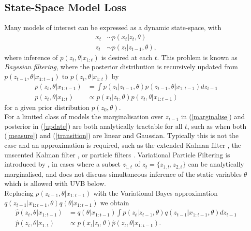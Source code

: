 \documentclass[12pt,a4paper]{article}\usepackage[]{graphicx}\usepackage[]{color}
\begin{document}
\subsection{State-Space Model Loss}

Many models of interest can be expressed as a dynamic state-space, with
\begin{align}
x_t &\sim p(x_t | z_{t}, \theta) \label{measure} \\
z_t &\sim p(z_t | z_{t-1}, \theta) \label{transition} ,
\end{align}
where inference of $p(z_t, \theta | x_{1:t})$ is desired at each $t$. This problem is known as \textit{Bayesian filtering}, where the posterior distribution is recursively updated from $p(z_{t-1}, \theta | x_{1:t-1})$ to $p(z_t, \theta | x_{1:t})$ by
\begin{align}
p(z_t, \theta | x_{1:t-1}) &= \int p(z_t | z_{t-1}, \theta) p(z_{t-1}, \theta | x_{1:t-1})dz_{t-1} \label{marginalise} \\
p(z_t, \theta | x_{1:t}) &\propto p(x_t | z_t, \theta) p(z_t, \theta | x_{1:t-1}) \label{update}
\end{align}
for a given prior distribution $p(z_0, \theta)$. 
\\

For a limited class of models the marginalisation over $z_{t-1}$ in (\ref{marginalise}) and posterior in (\ref{update}) are both analytically tractable for all $t$, such as when both (\ref{measure}) and (\ref{transition}) are linear and Gaussian. Typically this is not the case and an approximation is required, such as the extended Kalman filter \citep{Anderson1979}, the unscented Kalman filter \citep{Wan2000}, or particle filters \citet{Arulampalam2002}. Variational Particle Filtering is introduced by \citet{Smidl2008}, in cases where a subset $z_{1, t}$ of $z_t = \{z_{1, t}, z_{2, t}\}$ can be analytically marginalised, and does not discuss simultaneous inference of the static variables $\theta$ which is allowed with UVB below.
\\

Replacing $p(z_{t-1}, \theta | x_{1:t-1})$ with the Variational Bayes approximation $q(z_{t-1} | x_{1:t-1}, \theta)q(\theta|x_{1:t-1})$ we obtain 
\begin{align}
\hat{p}(z_t, \theta | x_{1:t-1}) &= q(\theta | x_{1:t-1}) \int p(z_t | z_{t-1}, \theta) q(z_{t-1} | x_{1:t-1}, \theta)dz_{t-1} \label{marginaliseHat} \\
\hat{p}(z_t, \theta | x_{1:t}) &\propto p(x_t | z_t, \theta)\hat{p}(z_t, \theta | x_{1:t-1}). \label{updateHat}
\end{align}
\end{document}
